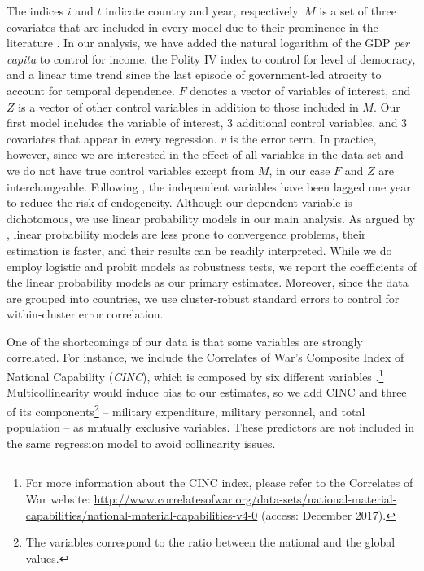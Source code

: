 The indices $i$ and $t$ indicate country and year, respectively. $M$ is a set of three covariates that are included in every model due to their prominence in the literature \citep{levine1992vale}. In our analysis, we have added the natural logarithm of the GDP \textit{per capita} to control for income, the Polity IV index to control for level of democracy, and a linear time trend since the last episode of government-led atrocity to account for temporal dependence. $F$ denotes a vector of variables of interest, and $Z$ is a vector of other control variables in addition to those included in $M$. Our first model includes the variable of interest, 3 additional control variables, and 3 covariates that appear in every regression. $v$ is the error term. In practice, however, since we are interested in the effect of all variables in the data set and we do not have true control variables except from $M$, in our case $F$ and $Z$ are interchangeable. Following \citet[514]{hegre2006sensitivity}, the independent variables have been lagged one year to reduce the risk of endogeneity. Although our dependent variable is dichotomous, we use linear probability models in our main analysis. As argued by \citet[298]{gassebner2016expect}, linear probability models are less prone to convergence problems, their estimation is faster, and their results can be readily interpreted. While we do employ logistic and probit models as robustness tests, we report the coefficients of the linear probability models as our primary estimates. Moreover, since the data are grouped into countries, we use cluster-robust standard errors to control for within-cluster error correlation.
 
One of the shortcomings of our data is that some variables are strongly correlated. For instance, we include the Correlates of War's Composite Index of National Capability (\textit{CINC}), which is composed by six different variables \citep{cow2017cinc,singer1988reconstructing}.\footnote{For more information about the CINC index, please refer to the Correlates of War website: \href{http://www.correlatesofwar.org/data-sets/national-material-capabilities/national-material-capabilities-v4-0}{http://www.correlatesofwar.org/data-sets/national-material-capabilities/national-material-capabilities-v4-0} (access: December 2017).} Multicollinearity would induce bias to our estimates, so we add CINC and three of its components\footnote{The variables correspond to the ratio between the national and the global values.} -- military expenditure, military personnel, and total population -- as mutually exclusive variables. These predictors are not included in the same regression model to avoid collinearity issues.
 
